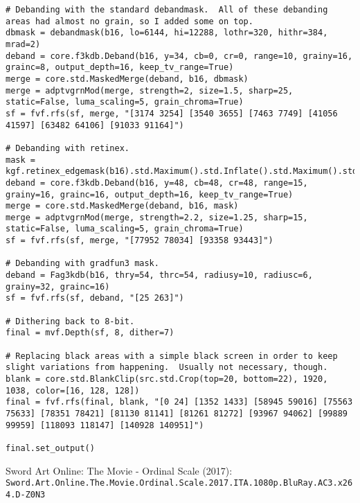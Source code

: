 \documentclass{scrartcl}
\begin{document}
\begin{lstlisting}
# Debanding with the standard debandmask.  All of these debanding areas had almost no grain, so I added some on top.
dbmask = debandmask(b16, lo=6144, hi=12288, lothr=320, hithr=384, mrad=2)
deband = core.f3kdb.Deband(b16, y=34, cb=0, cr=0, range=10, grainy=16, grainc=8, output_depth=16, keep_tv_range=True)
merge = core.std.MaskedMerge(deband, b16, dbmask)
merge = adptvgrnMod(merge, strength=2, size=1.5, sharp=25, static=False, luma_scaling=5, grain_chroma=True)
sf = fvf.rfs(sf, merge, "[3174 3254] [3540 3655] [7463 7749] [41056 41597] [63482 64106] [91033 91164]")

# Debanding with retinex.
mask = kgf.retinex_edgemask(b16).std.Maximum().std.Inflate().std.Maximum().std.Inflate()
deband = core.f3kdb.Deband(b16, y=48, cb=48, cr=48, range=15, grainy=16, grainc=16, output_depth=16, keep_tv_range=True)
merge = core.std.MaskedMerge(deband, b16, mask)
merge = adptvgrnMod(merge, strength=2.2, size=1.25, sharp=15, static=False, luma_scaling=5, grain_chroma=True)
sf = fvf.rfs(sf, merge, "[77952 78034] [93358 93443]")

# Debanding with gradfun3 mask.
deband = Fag3kdb(b16, thry=54, thrc=54, radiusy=10, radiusc=6, grainy=32, grainc=16)
sf = fvf.rfs(sf, deband, "[25 263]")

# Dithering back to 8-bit.
final = mvf.Depth(sf, 8, dither=7)

# Replacing black areas with a simple black screen in order to keep slight variations from happening.  Usually not necessary, though.
blank = core.std.BlankClip(src.std.Crop(top=20, bottom=22), 1920, 1038, color=[16, 128, 128])
final = fvf.rfs(final, blank, "[0 24] [1352 1433] [58945 59016] [75563 75633] [78351 78421] [81130 81141] [81261 81272] [93967 94062] [99889 99959] [118093 118147] [140928 140951]")

final.set_output()
\end{lstlisting}
Sword Art Online: The Movie - Ordinal Scale (2017):\\\texttt{Sword.Art.Online.The.Movie.Ordinal.Scale.2017.ITA.1080p.BluRay.AC3.x264.D-Z0N3}
\end{document}
